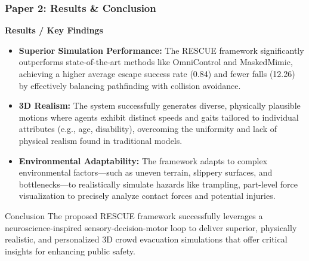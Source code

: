 \documentclass{beamer}
\begin{document}
\begin{frame}
\frametitle{Paper 2: Results \& Conclusion}
\scriptsize

\textbf{Results / Key Findings}
\begin{itemize}
    \item \textbf{Superior Simulation Performance:} The RESCUE framework significantly outperforms state-of-the-art methods like OmniControl and MaskedMimic, achieving a higher average escape success rate (0.84) and fewer falls (12.26) by effectively balancing pathfinding with collision avoidance.
    \item \textbf{3D Realism:} The system successfully generates diverse, physically plausible motions where agents exhibit distinct speeds and gaits tailored to individual attributes (e.g., age, disability), overcoming the uniformity and lack of physical realism found in traditional models.
    \item \textbf{Environmental Adaptability:} The framework adapts to complex environmental factors—such as uneven terrain, slippery surfaces, and bottlenecks—to realistically simulate hazards like trampling, part-level force visualization to precisely analyze contact forces and potential injuries.
\end{itemize}

\begin{alertblock}{Conclusion}
The proposed RESCUE framework successfully leverages a neuroscience-inspired sensory-decision-motor loop to deliver superior, physically realistic, and personalized 3D crowd evacuation simulations that offer critical insights for enhancing public safety.
\end{alertblock}
\end{frame}
\end{document}
